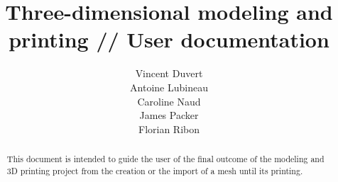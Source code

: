 \documentclass{article}
\title{Three-dimensional modeling and printing // User documentation}
\author{Vincent Duvert \\ Antoine Lubineau \\ Caroline Naud \\ James Packer \\ Florian Ribon}
\begin{document}
\maketitle

\begin{abstract}
This document is intended to guide the user of the final outcome of the modeling and 3D printing project from the creation or the import of a mesh until its printing.
\end{abstract}

\tableofcontents




\appendix
\end{document}
